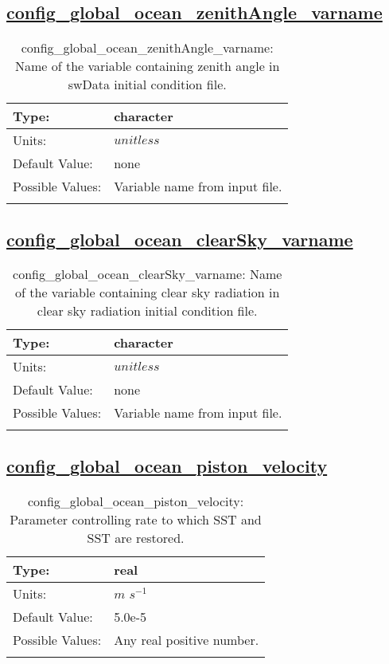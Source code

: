 \subsection[config\_global\_ocean\_zenithAngle\_varname]{\hyperref[sec:nm_tab_global_ocean]{config\_global\_ocean\_zenithAngle\_varname}}
\label{subsec:nm_sec_config_global_ocean_zenithAngle_varname}
\begin{center}
\begin{longtable}{| p{2.0in} || p{4.0in} |}
    \hline
    Type: & character \\
    \hline
    Units: & $unitless$ \\
    \hline
    Default Value: & none \\
    \hline
    Possible Values: & Variable name from input file. \\
    \hline
    \caption{config\_global\_ocean\_zenithAngle\_varname: Name of the variable containing zenith angle in swData initial condition file.}
\end{longtable}
\end{center}
\subsection[config\_global\_ocean\_clearSky\_varname]{\hyperref[sec:nm_tab_global_ocean]{config\_global\_ocean\_clearSky\_varname}}
\label{subsec:nm_sec_config_global_ocean_clearSky_varname}
\begin{center}
\begin{longtable}{| p{2.0in} || p{4.0in} |}
    \hline
    Type: & character \\
    \hline
    Units: & $unitless$ \\
    \hline
    Default Value: & none \\
    \hline
    Possible Values: & Variable name from input file. \\
    \hline
    \caption{config\_global\_ocean\_clearSky\_varname: Name of the variable containing clear sky radiation in clear sky radiation initial condition file.}
\end{longtable}
\end{center}
\subsection[config\_global\_ocean\_piston\_velocity]{\hyperref[sec:nm_tab_global_ocean]{config\_global\_ocean\_piston\_velocity}}
\label{subsec:nm_sec_config_global_ocean_piston_velocity}
\begin{center}
\begin{longtable}{| p{2.0in} || p{4.0in} |}
    \hline
    Type: & real \\
    \hline
    Units: & $m$ $s^{-1}$ \\
    \hline
    Default Value: & 5.0e-5 \\
    \hline
    Possible Values: & Any real positive number. \\
    \hline
    \caption{config\_global\_ocean\_piston\_velocity: Parameter controlling rate to which SST and SST are restored.}
\end{longtable}
\end{center}
